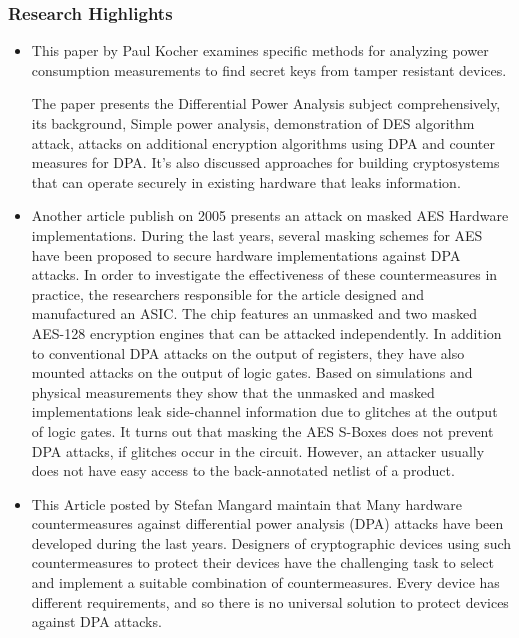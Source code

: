 \subsubsection{Research Highlights}

    \begin{itemize}
        \item   This paper \cite{kocher1999differential} by Paul Kocher examines specific methods for analyzing power consumption measurements to find secret keys from tamper resistant devices.
    
        The paper presents the Differential Power Analysis subject comprehensively, its background, Simple power analysis, demonstration of DES algorithm attack, attacks on additional encryption algorithms using DPA and counter measures for DPA.
        It’s also discussed approaches for building cryptosystems that can operate securely in existing hardware that leaks information.
        \item Another article publish on 2005 \cite{mangard2005successfully} presents an attack on masked AES Hardware implementations.
        During the last years, several masking schemes for AES have
        been proposed to secure hardware implementations against DPA attacks.
        In order to investigate the effectiveness of these countermeasures in practice,
        the researchers responsible for the article designed and manufactured an ASIC. The chip features an
        unmasked and two masked AES-128 encryption engines that can be attacked
        independently.
        In addition to conventional DPA attacks on the output of registers,
        they have also mounted attacks on the output of logic gates. Based on
        simulations and physical measurements they show that the unmasked and
        masked implementations leak side-channel information due to glitches
        at the output of logic gates. It turns out that masking the AES S-Boxes does not prevent DPA attacks, if glitches occur in the circuit. However, an attacker usually does not have easy access to the back-annotated
        netlist of a product.
        \item This Article posted by Stefan Mangard \cite{mangard2004hardware}
        maintain that  Many hardware countermeasures against differential power analysis (DPA) attacks have been developed during the last years. Designers of cryptographic devices using such countermeasures to protect their devices have the challenging task to select and implement a suitable combination of countermeasures. Every device has different requirements, and so there is no universal solution to protect devices against DPA  attacks.


\end{itemize}
